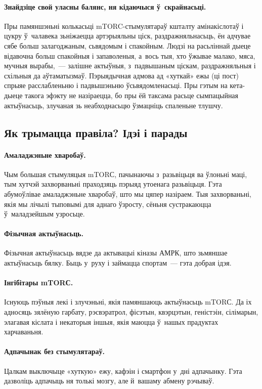 \paragraph{Знайдзіце свой уласны балянс, ня кідаючыся ў~скрайнасьці.}
Пры памяншэньні колькасьці mTORC-стымулятараў кшталту амінакіслотаў і цукру ў~чалавека зьніжаецца артэрыяльны ціск, раздражняльнасьць, ён адчувае сябе больш залагоджаным, сьвядомым і спакойным. Людзі на расьліннай дыеце відавочна больш спакойныя і запаволеныя, а~вось тыя, хто ўжывае малако, мяса, мучныя вырабы,~--- залішне актыўныя, з~падвышаным ціскам, раздражняльныя і схільныя да аўтаматызмаў. Пэрыядычная адмова ад «хуткай» ежы (ці пост) спрыяе расслабленьню і падвышэньню ўсьвядомленасьці. Пры гэтым на кета-дыеце такога эфэкту не назіраецца, бо пры ёй таксама расьце сымпацыйная актыўнасьць, злучаная зь неабходнасьцю ўзмацніць спаленьне тлушчу.

\subsection{Як трымацца правіла? Ідэі і парады}

\paragraph{Амаладжэньне хваробаў.}
Чым большая стымуляцыя mTORС, пачынаючы з~разьвіцьця ва ўлоньні маці, тым хутчэй захворваньні праходзяць пэрыяд утоенага разьвіцьця. Гэта абумоўлівае амаладжэньне хваробаў, што мы цяпер назіраем. Тыя захворваньні, якія мы лічылі тыповымі для аднаго ўзросту, сёньня сустракаюцца ў~маладзейшым узросьце.

\paragraph{Фізычная актыўнасьць.}
Фізычная актыўнасьць вядзе да актывацыі кіназы АМРК, што зьмяншае актыўнасьць бялку. Быць у~руху і займацца спортам~--- гэта добрая ідэя.

\paragraph{Інгібітары mTORС.}
Існуюць пэўныя лекі і злучэньні, якія памяншаюць актыўнасьць mTORС. Да іх адносяць зялёную гарбату, рэсвэратрол, фісэтын, квэрцэтын, геністэін, сілімарын, элагавая кіслата і некаторыя іншыя, якія маюцца ў~нашых прадуктах харчаваньня.

\paragraph{Адпачынак без стымулятараў.}
Цалкам выключыце «хуткую» ежу, кафэін і смартфон у~дні адпачынку. Гэта дазволіць адпачыць ня толькі мозгу, але й~вашаму абмену рэчываў.

